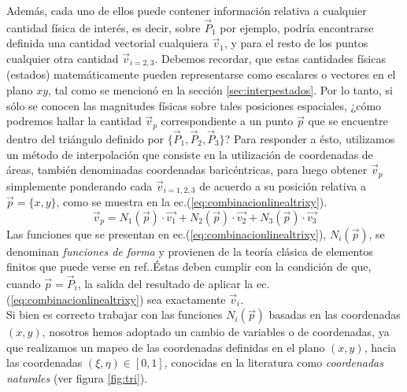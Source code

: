 Además, cada uno de ellos puede contener información relativa a cualquier cantidad física de interés, es decir, sobre $ \vec{P}_{1} $ por ejemplo, podría encontrarse definida una cantidad vectorial cualquiera $ \vec{v}_{1}$, y para el resto de los puntos cualquier otra cantidad $ \vec{v}_{i=2,3} $. Debemos recordar, que estas cantidades físicas (estados) matemáticamente pueden representarse como escalares o vectores en el plano $xy$, tal como se mencionó en la sección \ref{sec:interpestados}. Por lo tanto, si sólo se conocen las magnitudes físicas sobre tales posiciones espaciales, ¿cómo podremos hallar la cantidad $ \vec{v}_{p} $ correspondiente a un punto $\vec{p}$ que se encuentre dentro del triángulo definido por $ \lbrace \vec{P}_{1}, \vec{P}_{2}, \vec{P}_{3}  \rbrace $? Para responder a ésto, utilizamos un método de interpolación que consiste en la utilización de coordenadas de áreas, también denominadas coordenadas baricéntricas, para luego obtener $ \vec{v}_{p} $ simplemente ponderando cada $ \vec{v}_{i=1,2,3} $ de acuerdo a su posición relativa a $ \vec{p} = \lbrace x,y \rbrace $, como se muestra en la ec.(\ref{eq:combinacionlinealtrixy}).
\begin{equation}
\label{eq:combinacionlinealtrixy}  
  \vec{v}_{p} = 
  N_{1}(\vec{p}) \cdot \vec{v_1} + 
  N_{2}(\vec{p}) \cdot \vec{v_2} + 
  N_{3}(\vec{p}) \cdot \vec{v_3} 
\end{equation}
Las funciones que se presentan en ec.(\ref{eq:combinacionlinealtrixy}), $ N_{i} ( \vec{p} )$, se denominan \emph{funciones de forma} y provienen de la teoría clásica de elementos finitos que puede verse en ref.\cite{FE}.Éstas deben cumplir con la condición de que, cuando $ \vec{p} = \vec{P}_{i} $, la salida del resultado de aplicar la ec.(\ref{eq:combinacionlinealtrixy}) sea exactamente $\vec{v}_{i}$.\\
Si bien es correcto trabajar con las funciones $ N_{i} ( \vec{p} )$ basadas en las coordenadas $(x,y)$, nosotros hemos adoptado un cambio de variables o de coordenadas, ya que realizamos un mapeo de las coordenadas definidas en el plano $(x,y)$, hacia las coordenadas $ (\xi, \eta) \in [0, 1] $, conocidas en la literatura como \emph{coordenadas naturales} (ver figura \ref{fig:tri}).

